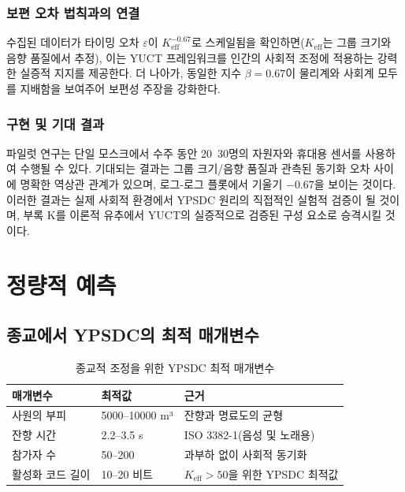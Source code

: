 \documentclass[12pt,a4paper]{article}
\newcommand{\Keff}{K_{\mathrm{eff}}}
\begin{document}
	\subsubsection{보편 오차 법칙과의 연결}
	수집된 데이터가 타이밍 오차 $\varepsilon$이 $\Keff^{-0.67}$로 스케일됨을 확인하면($\Keff$는 그룹 크기와 음향 품질에서 추정), 이는 YUCT 프레임워크를 인간의 사회적 조정에 적용하는 강력한 실증적 지지를 제공한다. 더 나아가, 동일한 지수 $\beta=0.67$이 물리계와 사회계 모두를 지배함을 보여주어 보편성 주장을 강화한다.
	
	\subsubsection{구현 및 기대 결과}
	파일럿 연구는 단일 모스크에서 수주 동안 20~30명의 자원자와 휴대용 센서를 사용하여 수행될 수 있다. 기대되는 결과는 그룹 크기/음향 품질과 관측된 동기화 오차 사이에 명확한 역상관 관계가 있으며, 로그-로그 플롯에서 기울기 $-0.67$을 보이는 것이다. 이러한 결과는 실제 사회적 환경에서 YPSDC 원리의 직접적인 실험적 검증이 될 것이며, 부록 K를 이론적 유추에서 YUCT의 실증적으로 검증된 구성 요소로 승격시킬 것이다.
	
	\section{정량적 예측}
	
	\subsection{종교에서 YPSDC의 최적 매개변수}
	
	\begin{table}[h]
		\centering
		\begin{tabular}{p{}p{}p{}}
			\toprule
			\textbf{매개변수} & \textbf{최적값} & \textbf{근거} \\
			\midrule
			사원의 부피 & 5000–10000 m³ & 잔향과 명료도의 균형 \\
			잔향 시간 & 2.2–3.5 s & ISO 3382-1(음성 및 노래용) \\
			참가자 수 & 50–200 & 과부하 없이 사회적 동기화 \\
			활성화 코드 길이 & 10–20 비트 & $K_{\mathrm{eff}} > 50$을 위한 YPSDC 최적값 \\
			\bottomrule
		\end{tabular}
		\caption{종교적 조정을 위한 YPSDC 최적 매개변수}
		\label{tab:optimal-params}
	\end{table}
	
\end{document}
